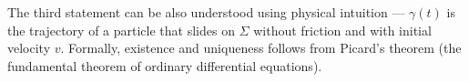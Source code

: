 The third statement can be also understood using physical intuition --- $\gamma(t)$ is the trajectory of a particle that slides on $\Sigma$ without friction and with initial velocity $v$.
Formally, existence and uniqueness follows from Picard's theorem (the  fundamental theorem of ordinary differential equations).
\qeds
